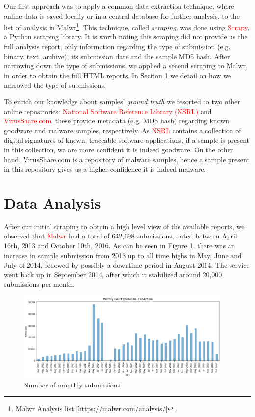 Our first approach was to apply a common data extraction technique, where online data is saved locally or in a central database for further analysis, to the list of analysis in Malwr\footnote{Malwr Analysis list [https://malwr.com/analysis/]}.
This technique, called \textit{scraping}, was done using \textcolor{red}{Scrapy}, a Python scraping library.
It is worth noting this scraping did not provide us the full analysis report, only information regarding the type of submission (e.g. binary, text, archive), its submission date and the sample MD5 hash.
After narrowing down the type of submissions, we applied a second scraping to Malwr, in order to obtain the full HTML reports. In Section \ref{section:data_analysis} we detail on how we narrowed the type of submissions.

To enrich our knowledge about samples' \textit{ground truth} we resorted to two other online repositories: \textcolor{red}{National Software Reference Library (NSRL)} and \textcolor{red}{VirusShare.com}, these provide metadata (e.g. MD5 hash) regarding known goodware and malware samples, respectively.
As \textcolor{red}{NSRL} contains a collection of digital signatures of known, traceable software applications, if a sample is present in this collection, we are more confident it is indeed goodware.
On the other hand, VirusShare.com is a repository of malware samples, hence a sample present in this repository gives us a higher confidence it is indeed malware.

\section{Data Analysis}
\label{section:data_analysis}

After our initial scraping to obtain a high level view of the available reports, we observed that \textcolor{red}{Malwr} had a total of 642,698 submissions, dated between April 16th, 2013 and October 10th, 2016. As can be seen in Figure \ref{fig:samples_count}, there was an increase in sample submission from 2013 up to all time highs in May, June and July of 2014, followed by possibly a downtime period in August 2014.
The service went back up in September 2014, after which it stabilized around 20,000 submissions per month.

\begin{figure}[!htb]
	\centering
	\includegraphics[width=0.95\textwidth]{Figures/samples_count.png}
	\caption[Number of monthly submissions.]{Number of monthly submissions.}
	\label{fig:samples_count}
\end{figure}

